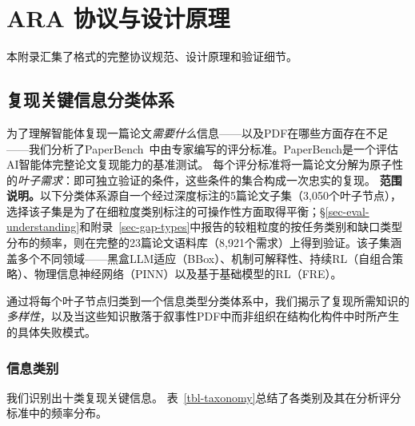 
\section{ARA 协议与设计原理}
\label{sec-protocol-details}

本附录汇集了\ara{}格式的完整协议规范、设计原理和验证细节。

\subsection{复现关键信息分类体系}
\label{sec-taxonomy}

为了理解智能体复现一篇论文\emph{需要什么}信息——以及PDF在哪些方面存在不足——我们分析了PaperBench~\citep{starace2025paperbench}中由专家编写的评分标准。PaperBench是一个评估AI智能体完整论文复现能力的基准测试。
每个评分标准将一篇论文分解为原子性的\emph{叶子需求}：即可独立验证的条件，这些条件的集合构成一次忠实的复现。
\textbf{范围说明。}以下分类体系源自一个经过深度标注的5篇论文子集（3{,}050个叶子节点），选择该子集是为了在细粒度类别标注的可操作性方面取得平衡；\S\ref{sec-eval-understanding}和附录~\ref{sec-gap-types}中报告的较粗粒度的按任务类别和缺口类型分布的频率，则在完整的23篇论文语料库（8{,}921个需求）上得到验证。该子集涵盖多个不同领域——黑盒LLM适应（BBox）、机制可解释性、持续RL（自组合策略）、物理信息神经网络（PINN）以及基于基础模型的RL（FRE）。

通过将每个叶子节点归类到一个信息类型分类体系中，我们揭示了复现所需知识的\emph{多样性}，以及当这些知识散落于叙事性PDF中而非组织在结构化构件中时所产生的具体失败模式。

\subsubsection{信息类别}

我们识别出十类复现关键信息。
表~\ref{tbl-taxonomy}总结了各类别及其在分析评分标准中的频率分布。

